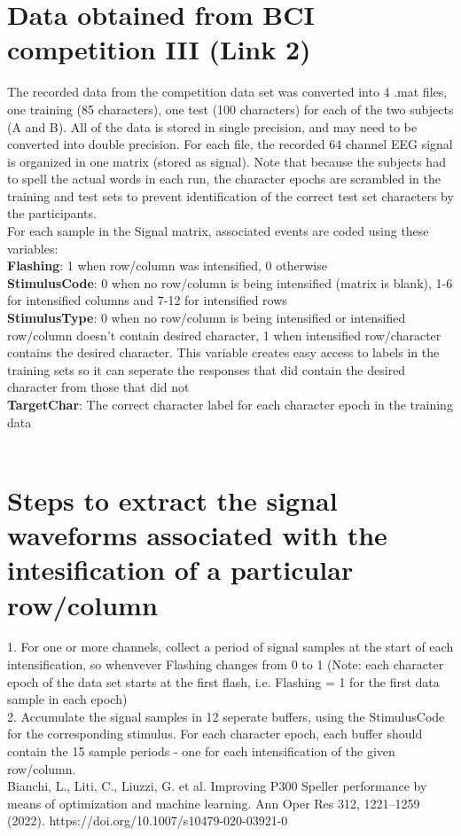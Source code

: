 \documentclass{article}
\begin{document}
\section{Data obtained from BCI competition III (Link 2)}
The recorded data from the competition data set was converted into 4 .mat files, one training (85 characters), one test (100 characters) for each of the two subjects (A and B). All of the data is stored in single precision, and may need to be converted into double precision. For each file, the recorded 64 channel EEG signal is organized in one matrix (stored as signal). Note that because the subjects had to spell the actual words in each run, the character epochs are scrambled in the training and test sets to prevent identification of the correct test set characters by the participants. \\
For each sample in the Signal matrix, associated events are coded using these variables: \\
\textbf{Flashing}: 1 when row/column was intensified, 0 otherwise \\
\textbf{StimulusCode}: 0 when no row/column is being intensified (matrix is blank), 1-6 for intensified columns and 7-12 for intensified rows \\
\textbf{StimulusType}: 0 when no row/column is being intensified or intensified row/column doesn't contain desired character, 1 when intensified row/character contains the desired character. This variable creates easy access to labels in the training sets so it can seperate the responses that did contain the desired character from those that did not \\
\textbf{TargetChar}: The correct character label for each character epoch in the training data \\ \\

\section{Steps to extract the signal waveforms associated with the intesification of a particular row/column}
1. For one or more channels, collect a period of signal samples at the start of each intensification, so whenvever Flashing changes from 0 to 1 (Note: each character epoch of the data set starts at the first flash, i.e. Flashing = 1 for the first data sample in each epoch) \\
2. Accumulate the signal samples in 12 seperate buffers, using the StimulusCode for the corresponding stimulus. For each character epoch, each buffer should contain the 15 sample periods - one for each intensification of the given row/column. \\



Bianchi, L., Liti, C., Liuzzi, G. et al. Improving P300 Speller performance by means of optimization and machine learning. Ann Oper Res 312, 1221–1259 (2022). https://doi.org/10.1007/s10479-020-03921-0
\end{document}
